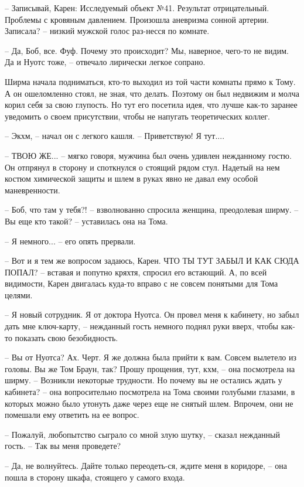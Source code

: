 – Записывай, Карен: Исследуемый объект №41. Результат отрицательный. Проблемы с кровяным давлением. Произошла аневризма сонной артерии. Записала? – низкий мужской голос раз-несся по комнате.

– Да, Боб, все. Фуф. Почему это происходит? Мы, наверное, чего-то не видим. Да и Нуотс тоже, – отвечало лирически легкое сопрано. 

Ширма начала подниматься, кто-то выходил из той части комнаты прямо к Тому. А он ошеломленно стоял, не зная, что делать. Поэтому он был недвижим и молча корил себя за свою глупость. Но тут его посетила идея, что лучше как-то заранее уведомить о своем присутствии, чтобы не напугать теоретических коллег. 

– Экхм, – начал он с легкого кашля. – Приветствую! Я тут....

– ТВОЮ ЖЕ... – мягко говоря, мужчина был очень удивлен нежданному гостю. Он отпрянул в сторону и споткнулся о стоящий рядом стул. Надетый на нем костюм химической защиты и шлем в руках явно не давал ему особой маневренности.

– Боб, что там у тебя?! – взволнованно спросила женщина, преодолевая ширму. – Вы еще кто такой? – уставилась она на Тома.

– Я немного... – его опять прервали.

– Вот и я тем же вопросом задаюсь, Карен. ЧТО ТЫ ТУТ ЗАБЫЛ И КАК СЮДА ПОПАЛ? – вставая и попутно кряхтя, спросил его встающий. А, по всей видимости, Карен двигалась куда-то вправо с не совсем понятыми для Тома целями. 

– Я новый сотрудник. Я от доктора Нуотса. Он провел меня к кабинету, но забыл дать мне ключ-карту, – нежданный гость немного поднял руки вверх, чтобы как-то показать свою безобидность. 

– Вы от Нуотса? Ах. Черт. Я же должна была прийти к вам. Совсем вылетело из головы. Вы же Том Браун, так? Прошу прощения, тут, кхм, – она посмотрела на ширму. – Возникли некоторые трудности. Но почему вы не остались ждать у кабинета? – она вопросительно посмотрела на Тома своими голубыми глазами, в которых можно было утонуть даже через еще не снятый шлем. Впрочем, они не помешали ему ответить на ее вопрос.

– Пожалуй, любопытство сыграло со мной злую шутку, – сказал нежданный гость. – Так вы меня проведете?

– Да, не волнуйтесь. Дайте только переодеть-ся, ждите меня в коридоре, – она пошла в сторону шкафа, стоящего у самого входа. 

